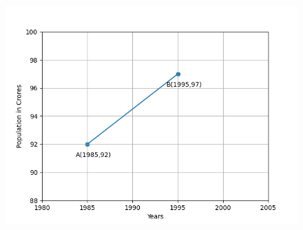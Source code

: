 \begin{enumerate}[label=\thesubsection.\arabic*,ref=\thesubsection.\theenumi]
\\
\begin{figure}[!ht]
\centering
\includegraphics[width = \columnwidth]{chapters/11/10/1/14/figs/fig.png}
\caption{}
\label{fig:chapters/11/10/1/14/1}
\end{figure}
\solution

\end{enumerate}
